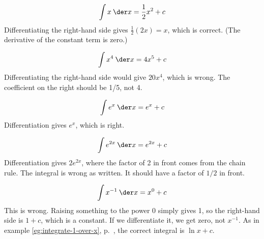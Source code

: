 \begin{equation*}
   \int x\:\der x = \frac{1}{2}x^2+c \\
\end{equation*}
Differentiating the right-hand side gives $\frac{1}{2}(2x)=x$, which is
correct. (The derivative of the constant term is zero.)

\begin{equation*}
   \int x^4\:\der x = 4x^5+c \\
\end{equation*}
Differentiating the right-hand side would give $20x^4$, which is wrong.
The coefficient on the right should be 1/5, not 4.

\begin{equation*}
   \int e^x\:\der x = e^x+c \\
\end{equation*}
Differentiation gives $e^x$, which is right.

\begin{equation*}
   \int e^{2x}\:\der x = e^{2x}+c
\end{equation*}
Differentiation gives $2e^{2x}$, where the factor of 2 in front comes
from the chain rule. The integral is wrong as written. It should have
a factor of $1/2$ in front.

\begin{equation*}
   \int x^{-1}\:\der x = x^0+c \\
\end{equation*}
This is wrong. Raising something to the power 0 simply gives 1, so the
right-hand side is $1+c$, which is a constant. If we differentiate it,
we get zero, not $x^{-1}$. As in example \ref{eg:integrate-1-over-x},
p.~\pageref{eg:integrate-1-over-x}, the correct integral is $\ln x+c$.
